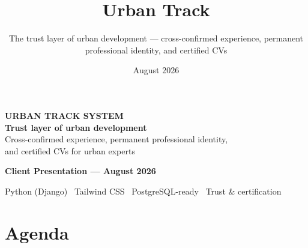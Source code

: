 \documentclass[aspectratio=169, 10pt]{beamer}
\title{Urban Track}
\subtitle{The trust layer of urban development --- cross-confirmed experience, permanent professional identity, and certified CVs}
\date{August 2026}
\begin{document}
{
\begin{frame}[plain]
  \centering
  \vspace*{0.55cm}
  {\color{utamber}\footnotesize\bfseries URBAN TRACK SYSTEM}\\[6pt]
  {\color{white}\Huge\bfseries Trust layer of urban development}\\[12pt]
  {\color{utlight}\large Cross-confirmed experience, permanent professional identity,\\[2pt]
  and certified CVs for urban experts}\\[22pt]
  \begin{tcolorbox}[enhanced, colback=utteal, colframe=utteal,
    boxrule=0pt, arc=4pt, width=0.62\textwidth, center, boxsep=8pt]
    \color{white}\small\bfseries Client Presentation --- August 2026
  \end{tcolorbox}
  \vspace{0.35cm}
  {\color{utlight}\footnotesize Python (Django) \textbullet\ Tailwind CSS \textbullet\ PostgreSQL-ready \textbullet\ Trust \& certification}
  \vspace{0.25cm}
\end{frame}
}

\section{Agenda}
\end{document}
